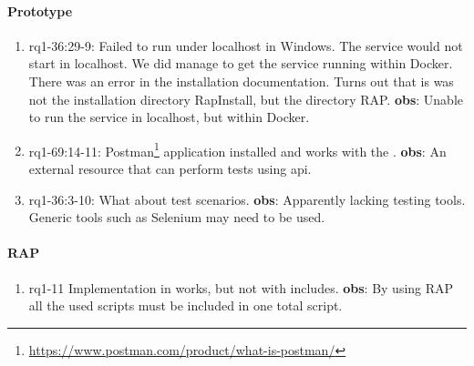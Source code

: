 \paragraph{Prototype}
\begin{enumerate}
    \item rq1-36:29-9: Failed to run  under localhost in Windows.
    The service would not start in localhost.
    We did manage to get the service running within Docker.
    There was an error in the installation documentation.
    Turns out that is was not the installation directory RapInstall, but the directory RAP.
    \newline\textbf{obs}: Unable to run the service in localhost, but within Docker.

    \item rq1-69:14-11: Postman\footnote{\url{https://www.postman.com/product/what-is-postman/}} application installed and works with the .
    \newline\textbf{obs}: An external resource that can perform tests using api.

    \item rq1-36:3-10: What about  test scenarios.
    \newline\textbf{obs}: Apparently lacking testing tools.
    Generic tools such as Selenium may need to be used.

\end{enumerate}

\paragraph{RAP}
\begin{enumerate}
    \item rq1-11 Implementation in  works, but not with includes.
    \newline\textbf{obs}: By using RAP all the used scripts must be included in one total script.
     
\end{enumerate}

